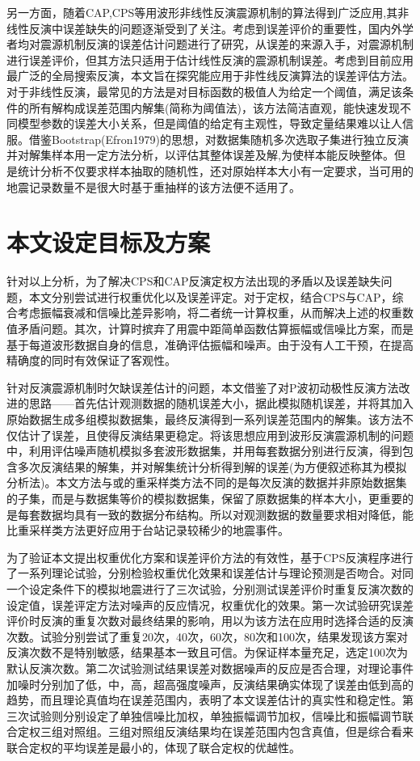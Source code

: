 另一方面，随着CAP,CPS等用波形非线性反演震源机制的算法得到广泛应用\citep{Luo2015,DAmico2014},其非线性反演中误差缺失的问题逐渐受到了关注。考虑到误差评价的重要性，国内外学者均对震源机制反演的误差估计问题进行了研究，\citet{Duputel2012}从误差的来源入手，对震源机制进行误差评价，但其方法只适用于估计线性反演的震源机制误差。考虑到目前应用最广泛的全局搜索反演，本文旨在探究能应用于非性线反演算法的误差评估方法。对于非线性反演，最常见的方法是对目标函数的极值人为给定一个阈值，满足该条件的所有解构成误差范围内解集(简称为阈值法)，该方法简洁直观，能快速发现不同模型参数的误差大小关系，但是阈值的给定有主观性，导致定量结果难以让人信服。借鉴Bootstrap(Efron1979)的思想，对数据集随机多次选取子集进行独立反演并对解集样本用一定方法分析，以评估其整体误差及解,为使样本能反映整体。但是统计分析不仅要求样本抽取的随机性，还对原始样本大小有一定要求，当可用的地震记录数量不是很大时基于重抽样的该方法便不适用了。

\section{本文设定目标及方案}

针对以上分析，为了解决CPS和CAP反演定权方法出现的矛盾以及误差缺失问题，本文分别尝试进行权重优化以及误差评定。对于定权，结合CPS与CAP，综合考虑振幅衰减和信噪比差异影响，将二者统一计算权重，从而解决上述的权重数值矛盾问题。其次，计算时摈弃了用震中距简单函数估算振幅或信噪比方案，而是基于每道波形数据自身的信息，准确评估振幅和噪声。由于没有人工干预，在提高精确度的同时有效保证了客观性。

针对反演震源机制时欠缺误差估计的问题，本文借鉴了\citet{Hardebeck2002}对P波初动极性反演方法改进的思路——首先估计观测数据的随机误差大小，据此模拟随机误差，并将其加入原始数据生成多组模拟数据集，最终反演得到一系列误差范围内的解集。该方法不仅估计了误差，且使得反演结果更稳定\citep{Hardebeck2002}。将该思想应用到波形反演震源机制的问题中，利用评估噪声随机模拟多套波形数据集，并用每套数据分别进行反演，得到包含多次反演结果的解集，并对解集统计分析得到解的误差(为方便叙述称其为模拟分析法)。本文方法与或\citet{Efron1979}的重采样类方法不同的是每次反演的数据并非原始数据集的子集，而是与数据集等价的模拟数据集，保留了原数据集的样本大小，更重要的是每套数据均具有一致的数据分布结构。所以对观测数据的数量要求相对降低，能比重采样类方法更好应用于台站记录较稀少的地震事件。

为了验证本文提出权重优化方案和误差评价方法的有效性，基于CPS反演程序进行了一系列理论试验，分别检验权重优化效果和误差估计与理论预测是否吻合。对同一个设定条件下的模拟地震进行了三次试验，分别测试误差评价时重复反演次数的设定值，误差评定方法对噪声的反应情况，权重优化的效果。第一次试验研究误差评价时反演的重复次数对最终结果的影响，用以为该方法在应用时选择合适的反演次数。试验分别尝试了重复20次，40次，60次，80次和100次，结果发现该方案对反演次数不是特别敏感，结果基本一致且可信。为保证样本量充足，选定100次为默认反演次数。第二次试验测试结果误差对数据噪声的反应是否合理，对理论事件加噪时分别加了低，中，高，超高强度噪声，反演结果确实体现了误差由低到高的趋势，而且理论真值均在误差范围内，表明了本文误差估计的真实性和稳定性。第三次试验则分别设定了单独信噪比加权，单独振幅调节加权，信噪比和振幅调节联合定权三组对照组。三组对照组反演结果均在误差范围内包含真值，但是综合看来联合定权的平均误差是最小的，体现了联合定权的优越性。


